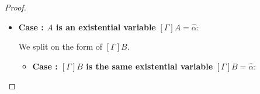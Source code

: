 \documentclass[a4paper]{article}
\makeatletter
\newcommand{\smallblacktriangle}{\text{\textscale{0.7}{$\blacktriangleright$}}}
\def\CompactJudgments{0}
\newcommand{\entails}{\mathrel{\ifnum\CompactJudgments=1\vdash \else \vdash\,\fi}}
\newcommand{\ctxoutsym}{\ifnum\CompactJudgments=1\dashv \else \,\dashv \fi}
\newcommand{\ctxout}[1]{\mathrel{\ctxoutsym}{#1}}
\newcommand{\MonnierCommaSym}{{\smallblacktriangle}}
\newcommand{\MonnierComma}[1]{{\MonnierCommaSym}_{#1}}
\newcommand{\subtypingycolor}[1]{\textcolor{dDigPurple}{#1}}
\newcommand{\subtype}{\mathrel{\normalfont\texttt{\subtypingycolor{<:}}}}  \newcommand{\declsubtype}{\mathrel{\leq}}
\newcommand{\Lemmaref}[1]{Lemma \ref{#1} (\nameref{#1})}   \newcommand{\Lemref}[1]{\Lemma \ref{#1}}   \newcommand{\Conjectureref}[1]{Conjecture \ref{#1}}
\newcommand{\BeginProof}{\renewcommand{\arraystretch}{1.1} \begin{tabular}[b]{r@{}r @{} l  l}}
\newcommand{\EndProof}{\end{tabular} \renewcommand{\arraystretch}{\mydefaultarraystretch}}
\newcommand{\Hand}{\text{\Pointinghand~~~~}}
\newcommand{\Pf}[4] {&$#1$ $#2$\, & $#3$ & #4 \\}
\newcommand{\Pfmrg}[3] {&$#1$\, & $#2$ & #3 \\}
\newcommand{\mkpf}[4] {\Pf{#2}{#1\,}{#3}{#4}}
\newcommand{\eqPf}[3] {\mkpf{=}{#1}{#2}{#3}}
\newcommand{\proofsep}{\,\\[-0.5em]}
\newenvironment{llproof}{\BeginProof}{\EndProof}
\newcommand{\ditto}{\ensuremath{''}}
\newcommand{\AllSym}{\forall}
\newcommand{\xAll}[1]{\AllSym#1}
\newcommand{\All}[1]{\xAll{#1}.\:}
\newcommand{\declsubjudgPf}[4] {\Pf{#1}{\entails}{{#2} \declsubtype {#3}}{#4}}
\newcommand{\subjudgPf}[5] {\Pf{#1}{\entails}{{#2} \subtype {#3} \ctxout{#4}}{#5}}
\newcommand{\substextendPf}[3] {\Pfmrg{{#1} \extendssym\,}{#2}{#3}}
\newcommand{\hypeq}[2]{{#1} = {#2}}
\newcommand{\alltype}[1]{\All{#1}}
\newcommand{\extendssym}{\longrightarrow}
\newcommand{\ahat}{\hat{\alpha}}
\makeatother
\begin{document}
\begin{proof}
\begin{itemize}
\begin{itemize}
\begin{llproof}
                      {[\Omega_0]B}
                      {By definition of substitution}
        \declsubjudgPf{[\Omega_0](\Gamma, \MonnierComma{\ahat}, \ahat)}
                      {[\Omega_0][\ahat / \alpha]A_0}
                      {[\Omega_0]B}
                      {By distributivity of substitution}
\proofsep
        \subjudgPf{\Gamma, \MonnierComma{\ahat}, \ahat} {[\Gamma, \MonnierComma{\ahat}, \ahat][\ahat / \alpha]A_0} {[\Gamma, \MonnierComma{\ahat}, \ahat]B} {\Delta_0}   {By i.h.}
        \substextendPf{\Delta_0} {\Omega''}    {\ditto}
        \substextendPf{\Omega_0} {\Omega''}    {\ditto}
        \subjudgPf{\Gamma, \MonnierComma{\ahat}, \ahat} {[\Gamma][\ahat / \alpha]A_0} {[\Gamma]B} {\Delta_0}   {By definition of substitution}
        \substextendPf{\Gamma, \MonnierComma{\ahat}, \ahat} {\Delta_0}   {By \Lemmaref{lem:subtyping-extension}}
        \eqPf{\Delta_0}{(\Delta, \MonnierComma{\ahat}, \Theta)}  {By \Lemmaref{lem:extension-order} (ii)}
        \substextendPf{\Gamma}{\Delta}   {\ditto}
        \eqPf{\Omega''}{(\Omega', \MonnierComma{\ahat}, \Omega_Z)}  {By \Lemmaref{lem:extension-order} (ii)}
\Hand        \substextendPf{\Delta}{\Omega'}   {\ditto}
        \substextendPf{\Omega_0} {\Omega''}    {Above}
        \substextendPf{\Omega, \MonnierComma{\ahat}, \hypeq{\ahat}{\tau}} {\Omega', \MonnierComma{\ahat}, \Omega_Z}    {By above equalities}
\Hand        \substextendPf{\Omega} {\Omega'}    {By \Lemmaref{lem:extension-order} (ii)}
        \proofsep
        \subjudgPf{\Gamma, \MonnierComma{\ahat}, \ahat}
                  {[\Gamma][\ahat/\alpha]A_0}
                  {[\Gamma]B}
                  {\Delta, \MonnierComma{\ahat}, \Theta}
                  {By above equality $\Delta_0 = (\Delta, \MonnierComma{\ahat}, \Theta)$}
\subjudgPf{\Gamma, \MonnierComma{\ahat}, \ahat}
                  {[\ahat/\alpha][\Gamma]A_0}
                  {[\Gamma]B}
                  {\Delta, \MonnierComma{\ahat}, \Theta}
                  {By def.\ of subst.\ ($[\Gamma]\ahat = \ahat$ and $[\Gamma]\alpha = \alpha$)}
\subjudgPf{\Gamma} {\alltype{\alpha}{[\Gamma]A_0}} {[\Gamma]B} {\Delta}   {By \SubAllL}
     \Hand      \subjudgPf{\Gamma} {\alltype{\alpha}{A'}} {[\Gamma]B} {\Delta}   {By above equality}
      \end{llproof}

      \smallskip

    \item \textbf{Case : $A$ is an existential variable} $[\Gamma]A = \ahat$:

      We split on the form of $[\Gamma]B$.
      \begin{itemize}
      \item \textbf{Case : $[\Gamma]B$ is the same existential variable}  $[\Gamma]B = \ahat$:


\end{itemize}
\end{itemize}
\end{itemize}
\end{proof}
\end{document}

